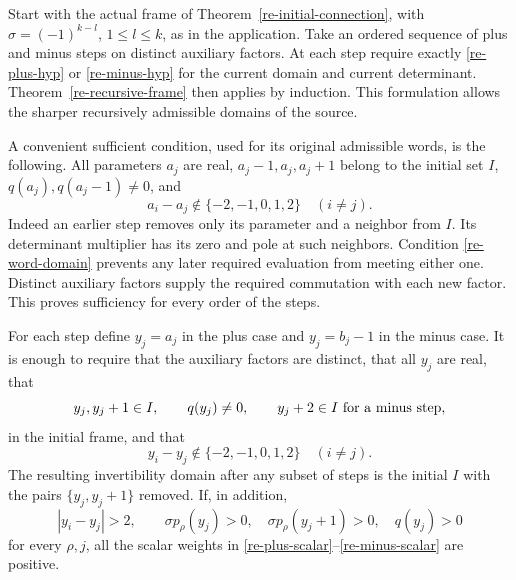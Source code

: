 Start with the actual frame of
Theorem~\ref{re-initial-connection}, with
\(\sigma=(-1)^{k-l}\), \(1\le l\le k\), as in the application.
Take an ordered sequence of plus and minus steps on distinct
auxiliary factors.  At each step require exactly
\eqref{re-plus-hyp} or \eqref{re-minus-hyp} for the current
domain and current determinant.
Theorem~\ref{re-recursive-frame} then applies by induction.
This formulation allows the sharper recursively admissible
domains of the source.

A convenient sufficient condition, used for its original
admissible words, is the following.  All parameters \(a_j\)
are real, \(a_j-1,a_j,a_j+1\) belong to the initial set \(I\),
\(q(a_j),q(a_j-1)\ne0\), and
\begin{equation}
             a_i-a_j\notin\{-2,-1,0,1,2\}\quad(i\ne j).
                                                               \label{re-word-domain}
\end{equation}
Indeed an earlier step removes only its parameter and a
neighbor from \(I\).  Its determinant multiplier has its
zero and pole at such neighbors.  Condition
\eqref{re-word-domain} prevents any later required evaluation
from meeting either one.  Distinct auxiliary factors supply
the required commutation with each new factor.
This proves sufficiency for every order of the steps.

\begin{lemma}\label{re-shifted-domain}
For each step define \(y_j=a_j\) in the plus case and
\(y_j=b_j-1\) in the minus case.
It is enough to require that the auxiliary factors are distinct,
that all \(y_j\) are real, that
\[
 y_j,y_j+1\in I,\qquad q(y_j)\ne0,\qquad
 y_j+2\in I\ \hbox{for a minus step},
\]
in the initial frame, and that
\[
 y_i-y_j\notin\{-2,-1,0,1,2\}\quad(i\ne j).
\]
The resulting invertibility domain after any subset of steps is
the initial \(I\) with the pairs \(\{y_j,y_j+1\}\) removed.
If, in addition,
\begin{equation}
 |y_i-y_j|>2,\qquad
 \sigma p_\rho(y_j)>0,\quad
 \sigma p_\rho(y_j+1)>0,\quad q(y_j)>0
                                                               \label{re-shifted-signs}
\end{equation}
for every \(\rho,j\), all the scalar weights in
\eqref{re-plus-scalar}--\eqref{re-minus-scalar} are positive.
\end{lemma}

